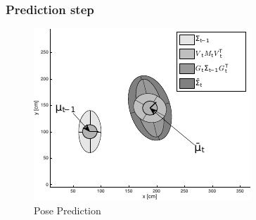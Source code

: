 \begin{frame}
   \frametitle{Prediction step}
   
   \begin{figure}[!h]
        \includegraphics[width=0.5\columnwidth]{./images/ekf_prediction_step.pdf}
        \caption{Pose Prediction}
   \end{figure}
   
\end{frame}
   
